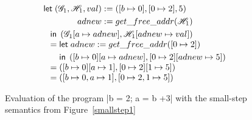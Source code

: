 \begin{figure}
\[\begin{array}{l}
\begin{aligned}[t]
      \mathsf{let}\;
        \begin{aligned}[t]
          \left(\mathscr{G}_1, \mathscr{H}_1, val\right) &:= \left([b \mapsto 0], [0 \mapsto 2], 5\right) \\
          adnew &:= get\_free\_addr(\mathscr{H}_1) \\
        \end{aligned}\\
      \quad \mathsf{in}\; \left(\mathscr{G}_1[a \mapsto adnew], \mathscr{H}_1[adnew \mapsto val]\right) \\
    \end{aligned}\\
    \quad=
    \begin{aligned}[t]
      &\mathsf{let}\; adnew := get\_free\_addr([0 \mapsto 2]) \\
      &\mathsf{in}\; \left([b \mapsto 0][a \mapsto adnew], [0 \mapsto 2][adnew \mapsto 5]\right) \\
    \end{aligned}\\
    \quad= \left([b \mapsto 0][a \mapsto 1], [0 \mapsto 2][1 \mapsto 5]\right) \\
    \quad= \left([b \mapsto 0, a \mapsto 1], [0 \mapsto 2, 1 \mapsto 5]\right) \\
  \end{array}
\]
  \caption{Evaluation of the program \pycode|b = 2; a = b +3| with the small-step
    semantics from Figure~\ref{smallstep1}\label{evaluatingprog}}
\end{figure}

